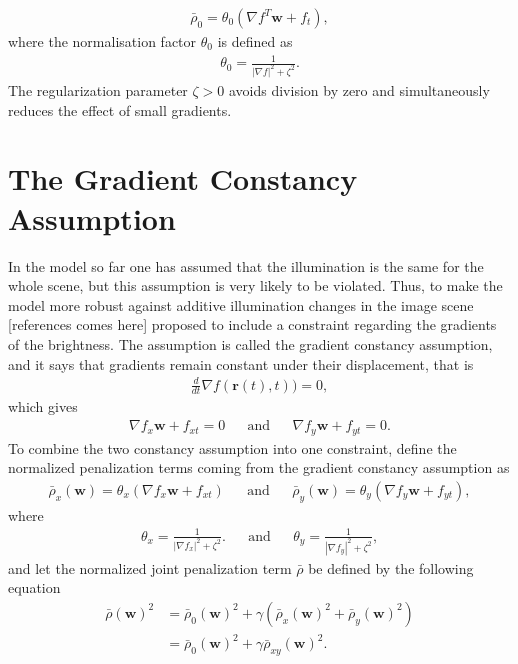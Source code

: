 \begin{align}
\label{norm_rho}
\bar{\rho}_0 = \theta_0 (\nabla f^T \textbf{w}+ f_t),
\end{align}
where the normalisation factor $\theta_0$ is defined as
\begin{align*}
\theta_0 = \frac{1}{|\nabla f|^2 + \zeta^2}.
\end{align*}
The regularization parameter $\zeta > 0$ avoids division by zero and simultaneously reduces the effect of small gradients.
\section{The Gradient Constancy Assumption}
In the model so far one has assumed that the illumination is the same for the whole scene, but this assumption is very likely to be violated. Thus, to make the model more robust against additive illumination changes in the image scene [references comes here] proposed to include a constraint regarding the gradients of the brightness. The assumption is called the gradient constancy assumption, and it says that gradients remain constant under their displacement, that is
\begin{align}
\frac{d}{dt}\nabla f(\textbf{r}(t),t)) = 0,
\end{align}
which gives
\begin{align}
\label{gca_constraint}
\nabla f_x \textbf{w} + f_{xt} = 0 & & \text{and} & &  \nabla f_y \textbf{w} + f_{yt} = 0.
\end{align}
To combine the two constancy assumption into one constraint,  define the normalized penalization terms coming from the gradient constancy assumption as
\begin{align}
\bar{\rho}_x(\textbf{w}) = \theta_x (\nabla f_x \textbf{w} + f_{xt}) & & \text{and} & & \bar{\rho}_y(\textbf{w})  = \theta_y (\nabla f_y \textbf{w} + f_{yt}),
\end{align}
where 
\begin{align*}
\theta_x = \frac{1}{|\nabla f_x|^2 + \zeta^2}. & & \text{and} & & \theta_y = \frac{1}{|\nabla f_y|^2 + \zeta^2},
\end{align*}
and let the normalized joint penalization term $\bar{\rho}$ be defined by the following equation
\begin{align*}
\bar{\rho}(\textbf{w})^2 &= \bar{\rho}_0(\textbf{w})^2 + \gamma (\bar{\rho}_x(\textbf{w})^2 + \bar{\rho}_y(\textbf{w})^2) \\
&=  \bar{\rho}_0(\textbf{w})^2 + \gamma \bar{\rho}_{xy}(\textbf{w})^2.
\end{align*}
